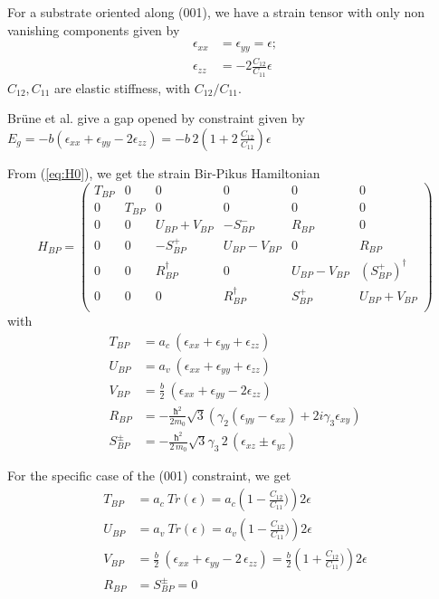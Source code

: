 \documentclass[prb,aps]{revtex4}
\begin{document}
        For a substrate oriented along (001), we have a strain tensor with only non vanishing components given by
		\begin{align}
			ϵ_{xx} &= ϵ_{yy} = ϵ  ;\\
			ϵ_{zz} &= -2 \frac{C_{12}}{C_{11}} ϵ
		\end{align}
		$C_{12},C_{11}$ are elastic stiffness, with $C_{12}/C_{11}$.

		Brüne et al. give a gap opened by constraint given by
		$E_g = -b (ϵ_{xx} + ϵ_{yy} - 2 ϵ_{zz} )  = -b\,2\left(1 + 2\,\frac{C_{12}}{C_{11}}\right) ϵ$

		From (\ref{eq:H0}), we get the strain Bir-Pikus Hamiltonian
		\begin{equation}
			\label{eq:H-BP}
			H_{BP}=
			\begin{pmatrix}
				T_{BP} & 0 & 0 &0 &0 &0     \\
				0 & T_{BP} & 0 & 0 &0 &0   \\
				0 & 0 & U_{BP}+V_{BP} & -S^-_{BP} & R_{BP} & 0  \\
				0 & 0 & - S_{BP}^+ & U_{BP}-V_{BP} & 0& R_{BP} \\
				0& 0 & R_{BP}^\dagger & 0 & U_{BP}-V_{BP} & (S_{BP}^+)^\dagger \\
				0 & 0 & 0 & R_{BP}^\dagger & S_{BP}^+ & U_{BP}+V_{BP}  \\
			\end{pmatrix}
		\end{equation}
		with
		\begin{align}
			T_{BP} &=  a_c~ \left(  ϵ_{xx} + ϵ_{yy} + ϵ_{zz}  \right)  \\
			U_{BP} &= a_v~ \left(  ϵ_{xx} + ϵ_{yy} + ϵ_{zz}  \right)   \\
			V_{BP} &= \frac{b}{2}~ \left(  ϵ_{xx} + ϵ_{yy} -2  ϵ_{zz}  \right)  \\
			R_{BP} &= - \frac{ħ^2 }{2m_0} \sqrt{3} \left( γ_2( ϵ_{yy} - ϵ_{xx}) + 2 i γ_3  ϵ_{xy} \right) \\
			S^\pm_{BP} &= - \frac{ħ^2 }{2\,m_0} \sqrt{3} γ_3\,2\,(ϵ_{xz} \pm ϵ_{yz} )
		\end{align}

		For the specific case of the (001) constraint, we get
		\begin{align}
			T_{BP} &= a_c~ Tr(ϵ) = a_c \left( 1-\frac{C_{12}}{C_{11}}) \right) 2 ϵ  \\
			U_{BP} &= a_v~ Tr(ϵ) = a_v \left( 1-\frac{C_{12}}{C_{11}}) \right) 2 ϵ    \\
			V_{BP} &= \frac{b}{2}~ \left( ϵ_{xx} + ϵ_{yy} - 2\,ϵ_{zz} \right) = \frac{b}{2}   \left( 1+\frac{C_{12}}{C_{11}})   \right) 2 ϵ   \\
			R_{BP} &= S^\pm_{BP} =0
		\end{align}
\end{document}

